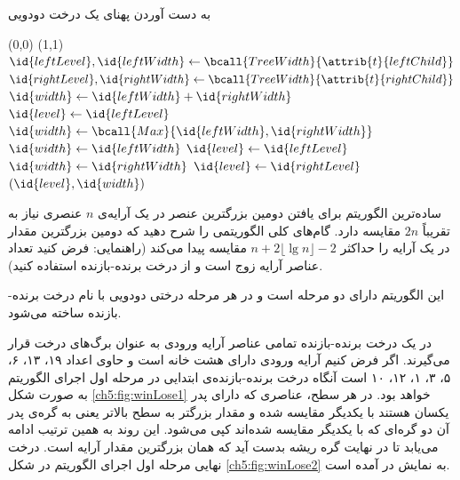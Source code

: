 \begin{algorithm}
\caption{به دست آوردن پهنای یک درخت دودویی}\label{ch5:alg:treeWidth}
\begin{latin}
\begin{algorithmic}[1]
			\State	\Return (0,0)
		\EndIf
			\State	\Return (1,1)
		\EndIf
		\State	$\id{leftLevel},\id{leftWidth} \gets \bcall{TreeWidth}{\attrib{t}{leftChild}}$
		\State	$\id{rightLevel},\id{rightWidth} \gets \bcall{TreeWidth}{\attrib{t}{rightChild}}$
			\State	$\id{width} \gets \id{leftWidth}+\id{rightWidth}$
			\State	$\id{level} \gets \id{leftLevel}$
		\Else
			\State	$\id{width} \gets \bcall{Max}{\id{leftWidth},\id{rightWidth}}$
				\State	$\id{width} \gets \id{leftWidth}$
				\State	$\id{level} \gets \id{leftLevel}$
			\Else			
				\State	$\id{width} \gets \id{rightWidth}$			
				\State	$\id{level} \gets \id{rightLevel}$
			\EndIf
		\EndIf
		\State	\Return	$(\id{level},\id{width})$
\EndFunction
\end{algorithmic}
\end{latin}
\end{algorithm}


 ساده‌ترین الگوریتم برای یافتن دومین بزرگترین عنصر در یک آرایه‌ی {$n$} عنصری نیاز به تقریباً {$2n$} مقایسه دارد. گام‌های کلی الگوریتمی را شرح دهید که دومین بزرگترین مقدار در یک آرایه را حداکثر {$n+2\lfloor \lg n \rfloor - 2$} مقایسه پیدا می‌کند (راهنمایی: فرض کنید تعداد عناصر آرایه زوج است و از درخت‌ برنده-بازنده استفاده کنید).


این الگوریتم دارای دو مرحله است و در هر مرحله درختی دودویی با نام درخت برنده-بازنده ساخته می‌شود.

در یک درخت برنده-بازنده تمامی عناصر آرایه ورودی به عنوان برگ‌های درخت قرار می‌گیرند. اگر فرض کنیم آرایه ورودی دارای هشت خانه است و حاوی اعداد ۱۹، ۱۳، ۶، ۵، ۳، ۱، ۱۲، ۱۰ است آنگاه درخت برنده-بازنده‌ی ابتدایی در مرحله اول اجرای الگوریتم به صورت شکل {\eqref{ch5:fig:winLose1}} خواهد بود. در هر سطح، عناصری که دارای پدر یکسان هستند با یکدیگر مقایسه شده و مقدار بزرگتر به سطح بالاتر یعنی به گره‌ی پدر آن دو گره‌ای که با یکدیگر مقایسه شده‌اند کپی می‌شود. این روند به همین ترتیب ادامه می‌یابد تا در نهایت گره ریشه بدست آید که همان بزرگترین مقدار آرایه است. درخت نهایی مرحله اول اجرای الگوریتم در شکل {\eqref{ch5:fig:winLose2}} به نمایش در آمده است. 


